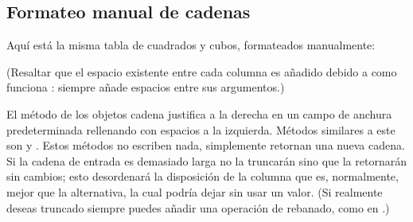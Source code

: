 \documentclass[a4,10pt,spanish]{sphinxmanual}
\begin{document}
\subsection{Formateo manual de cadenas}
\label{\detokenize{tutorial/inputoutput:manual-string-formatting}}
\sphinxAtStartPar
Aquí está la misma tabla de cuadrados y cubos, formateados manualmente:

\begin{sphinxVerbatim}[commandchars=\\\{\}]
    
      
    
    
\end{sphinxVerbatim}

\sphinxAtStartPar
(Resaltar que el espacio existente entre cada columna es añadido debido a como funciona : siempre añade espacios entre sus argumentos.)

\sphinxAtStartPar
El método  de los objetos cadena justifica a la derecha en un campo de anchura predeterminada  rellenando con espacios a la izquierda. Métodos similares a este son  y . Estos métodos no escriben nada, simplemente retornan una nueva cadena. Si la cadena de entrada es demasiado larga no la truncarán sino que la retornarán sin cambios; esto desordenará la disposición de la columna que es, normalmente, mejor que la alternativa, la cual podría dejar sin usar un valor. (Si realmente deseas truncado siempre puedes añadir una operación de rebanado, como en .)
\end{document}

